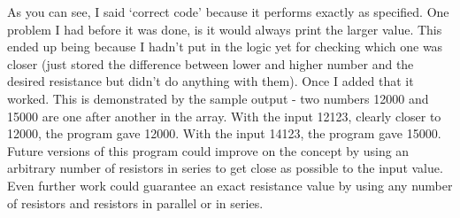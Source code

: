 \documentclass{article}
\begin{document}
As you can see, I said `correct code' because it performs
exactly as specified. One problem I had before it was
done, is it would always print the larger value. This
ended up being because I hadn't put in the logic yet
for checking which one was closer (just stored the
difference between lower and higher number and the
desired resistance but didn't do anything with them).
Once I added that it worked. This is demonstrated by
the sample output - two numbers 12000 and 15000 are
one after another in the array. With the input 12123,
clearly closer to 12000, the program gave 12000.
With the input 14123, the program gave 15000.\\

Future versions of this program could improve on the concept
by using an arbitrary number of resistors in series to get close as
possible to the input value. Even further work could
guarantee an exact resistance value by using any number of
resistors and resistors in parallel or in series.
\end{document}
